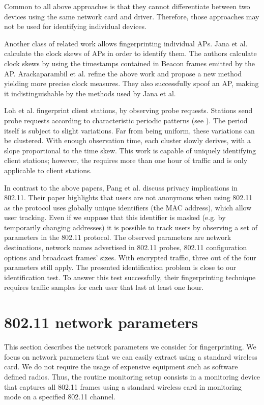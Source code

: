 \documentclass[10pt, conference, compsocconf, letterpaper]{IEEEtran}
\begin{document}
Common to all above approaches is that they cannot differentiate between two devices using the same network card and driver. Therefore, those approaches may not be used for identifying individual devices.

Another class of related work allows fingerprinting individual APs.
Jana et al. \cite{Jana:Mobicom} calculate the clock skews of APs in order to identify them. 
The authors calculate clock skews by using the timestamps contained in Beacon frames 
emitted by the AP. 
Arackaparambil et al. \cite{Arackaparambil:Wisec} refine the above work and propose a new method yielding more 
precise clock measures. They also successfully spoof an AP, making it indistinguishable 
by the methods used by Jana et al. 


Loh et al. \cite{Loh:WiSec} fingerprint client stations, by observing 
probe requests. Stations send probe requests according to characteristic 
periodic patterns (see \cite{Franklin:Security06}).  The period itself is subject to slight variations. 
Far from being uniform, these variations can be clustered. 
With enough observation time, each cluster slowly derives, with a slope proportional to the time skew. 
This work is capable of uniquely identifying client stations; however, the requires more than one hour of traffic and
is only applicable to client stations.

In contrast to the above papers, Pang et al. \cite{Pang:Mobicom} discuss privacy implications in 802.11. 
Their paper highlights that users are not anonymous when using 802.11 as the protocol uses globally 
unique identifiers (the MAC address), which allow user tracking. 
Even if we suppose that this identifier is masked (e.g. by temporarily changing addresses) 
it is possible to track users by observing a set 
of parameters in the 802.11 protocol. 
The observed parameters are network destinations, network names 
advertised in 802.11 probes, 802.11 configuration options and broadcast frames' sizes.  
With encrypted traffic, three out of the four parameters still apply. 
The presented identification problem is close to our identification test.
To answer this test successfully, their fingerprinting technique requires traffic 
samples for each user that last at least one hour.





\section{802.11 network parameters}
\label{sec:parameters}
This section describes the network parameters we consider for fingerprinting.
We focus on network parameters that we can easily extract using a standard wireless card. We do not require the usage of expensive equipment such as software defined radios. Thus, the routine monitoring setup consists in a monitoring device that captures all 802.11 frames using a standard wireless card in monitoring mode on a specified 802.11 channel. 
\end{document}
